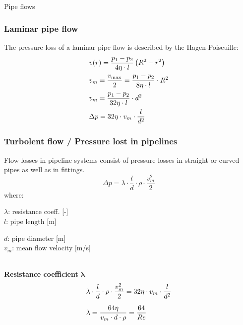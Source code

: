 \documentclass{article}
\begin{document}
\begin{multicols}{2}
\begin{theorybox}{Pipe flows}
    \subsubsection{Laminar pipe flow}
    The pressure loss of a laminar pipe flow is described by the Hagen-Poiseuille:
    \begin{align}
        &v(r) = \frac{p_1 - p_2}{4\eta \cdot l}\left(R^2 - r^2\right)\\
        &v_m = \frac{v_{\rm max}}{2} = \frac{p_1 - p_2}{8\eta \cdot l}\cdot R^2 \notag \\
        &v_m = \frac{p_1 - p_2}{32\eta \cdot l}\cdot d^2 \notag \\
        &\Delta p = 32\eta \cdot v_m\cdot \frac{l}{d^2}
    \end{align}

    \subsubsection{Turbolent flow / Pressure lost in pipelines}
    Flow losses in pipeline systems consist of pressure losses in straight
    or curved pipes as well as in fittings.
    \begin{equation}
        \Delta p = \lambda \cdot \frac{l}{d} \cdot \rho \cdot \frac{v_m^2}{2}
    \end{equation}
    where:
    \\
    \begin{minipage}[t]{0.45\linewidth}
        $\lambda$: resistance coeff. [-] \\
        $l$: pipe length [m]
    \end{minipage}%
    \hfill
    \begin{minipage}[t]{0.55\linewidth}
        $d$: pipe diameter [m] \\
        $v_m$: mean flow velocity [m/s]
    \end{minipage}
    \\[2ex]
    \textbf{Resistance coefficient} $\mathbf{\lambda}$
    \begin{align}
        &\lambda \cdot \frac{l}{d} \cdot \rho \cdot \frac{v_m^2}{2} = 32\eta \cdot v_m \cdot \frac{l}{d^2} \notag \\[1.5ex]
        &\lambda = \frac{64\eta}{v_m \cdot d \cdot \rho} \notag = \frac{64}{Re}
    \end{align}

\end{theorybox}


\end{multicols}
\end{document}
